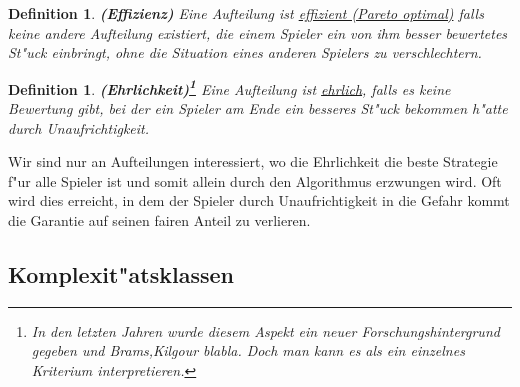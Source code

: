 \documentclass[11pt, a4paper, twoside]{article}
\newtheorem{defi}[satz]{Definition}
\numberwithin{equation}{section}
\begin{document}
\begin{defi}{\textbf{(Effizienz)}}
\newline Eine Aufteilung ist \underline{effizient (Pareto optimal)} falls keine andere Aufteilung existiert, die einem Spieler ein von ihm besser bewertetes St"uck einbringt, ohne die Situation eines anderen Spielers zu verschlechtern. 
\end{defi}
\begin{defi}{\textbf{(Ehrlichkeit)\footnote{In den letzten Jahren wurde diesem Aspekt ein  neuer Forschungshintergrund gegeben und Brams,Kilgour blabla. Doch man kann es als ein einzelnes Kriterium interpretieren.}}}
\newline Eine Aufteilung ist \underline{ehrlich}, falls es keine Bewertung gibt, bei der ein Spieler am Ende ein besseres St"uck bekommen h"atte durch Unaufrichtigkeit. 
\end{defi} 
Wir sind nur an Aufteilungen interessiert, wo die Ehrlichkeit die beste Strategie f"ur alle Spieler ist und somit allein durch den Algorithmus erzwungen wird. Oft wird dies erreicht, in dem der Spieler durch Unaufrichtigkeit in die Gefahr kommt die Garantie auf seinen fairen Anteil zu verlieren.\\
\subsection{Komplexit"atsklassen}
\end{document}
